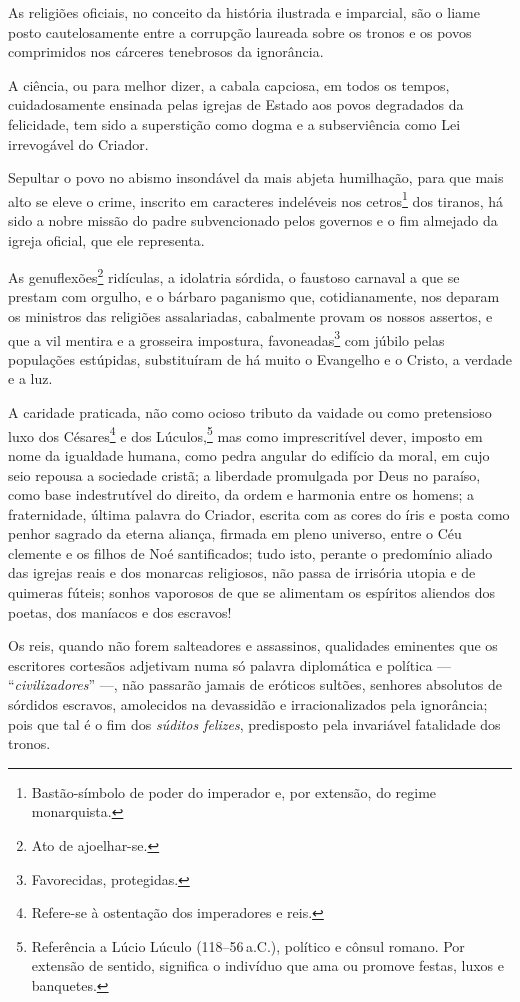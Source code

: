 As religiões oficiais, no conceito da história ilustrada e imparcial,
são o liame posto cautelosamente entre a corrupção laureada sobre os
tronos e os povos comprimidos nos cárceres tenebrosos da ignorância.

A ciência, ou para melhor dizer, a cabala capciosa, em todos os tempos,
cuidadosamente ensinada pelas igrejas de Estado aos povos degradados da
felicidade, tem sido a superstição como dogma e a subserviência como Lei
irrevogável do Criador.

Sepultar o povo no abismo insondável da mais abjeta humilhação, para que
mais alto se eleve o crime, inscrito em caracteres indeléveis nos
cetros\footnote{Bastão-símbolo de poder do imperador e, por extensão,
  do regime monarquista.} dos tiranos, há sido a nobre missão do padre
subvencionado pelos governos e o fim almejado da igreja oficial, que ele
representa.

As genuflexões\footnote{Ato de ajoelhar-se.} ridículas, a idolatria
sórdida, o faustoso carnaval a que se prestam com orgulho, e o bárbaro
paganismo que, cotidianamente, nos deparam os ministros das religiões
assalariadas, cabalmente provam os nossos assertos, e que a vil mentira
e a grosseira impostura, favoneadas\footnote{Favorecidas, protegidas.}
com júbilo pelas populações estúpidas, substituíram de há muito o
Evangelho e o Cristo, a verdade e a luz.

A caridade praticada, não como ocioso tributo da vaidade ou como
pretensioso luxo dos Césares\footnote{Refere-se à ostentação dos
  imperadores e reis.} e dos Lúculos,\footnote{Referência a Lúcio
  Lúculo (118--56\,a.C.), político e cônsul romano. Por extensão de
  sentido, significa o indivíduo que ama ou promove festas, luxos e
  banquetes.} mas como imprescritível dever, imposto em nome da
igualdade humana, como pedra angular do edifício da moral, em cujo seio
repousa a sociedade cristã; a liberdade promulgada por Deus no paraíso,
como base indestrutível do direito, da ordem e harmonia entre os homens;
a fraternidade, última palavra do Criador, escrita com as cores do íris
e posta como penhor sagrado da eterna aliança, firmada em pleno
universo, entre o Céu clemente e os filhos de Noé santificados; tudo
isto, perante o predomínio aliado das igrejas reais e dos monarcas
religiosos, não passa de irrisória utopia e de quimeras fúteis; sonhos
vaporosos de que se alimentam os espíritos aliendos dos poetas, dos
maníacos e dos escravos!

Os reis, quando não forem salteadores e assassinos, qualidades eminentes
que os escritores cortesãos adjetivam numa só palavra diplomática e
política --- ``\emph{civilizadores}'' ---, não passarão jamais de eróticos %
sultões, senhores absolutos de sórdidos escravos, amolecidos na
devassidão e irracionalizados pela ignorância; pois que tal é o fim dos
\emph{súditos felizes}, predisposto pela invariável fatalidade dos
tronos.

